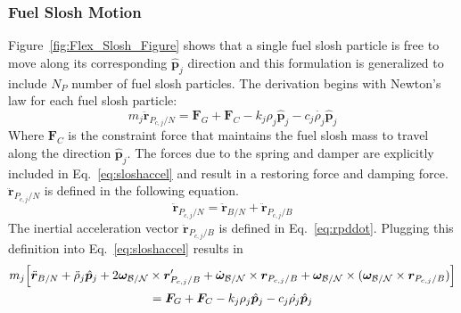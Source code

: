 \subsubsection{Fuel Slosh Motion}
Figure~\ref{fig:Flex_Slosh_Figure} shows that a single fuel slosh particle is free to move along its corresponding $\hat{\bm p}_j$ direction and this formulation is generalized to include $N_P$ number of fuel slosh particles. The derivation begins with Newton's law for each fuel slosh particle:
\begin{equation}
	m_j \ddot{\bm{r}}_{P_{c,j}/N} = \bm F_G + \bm F_C- k_j \rho_j \hat{\bm p}_j - c_j \dot{\rho_j} \hat{\bm p}_j
	\label{eq:sloshaccel}
\end{equation}
Where $\bm F_C$ is the constraint force that maintains the fuel slosh mass to travel along the direction $\hat{\bm p}_j$. The forces due to the spring and damper are explicitly included in Eq.~\eqref{eq:sloshaccel} and result in a restoring force and damping force. $\ddot{\bm{r}}_{P_{c,j}/N}$ is defined in the following equation.
\begin{equation}
	\ddot{\bm{r}}_{P_{c,j}/N} = \ddot{\bm{r}}_{B/N} + \ddot{\bm{r}}_{P_{c,j}/B}
\end{equation}
The inertial acceleration vector $\ddot{\bm{r}}_{P_{c,j}/B}$ is defined in Eq.~\eqref{eq:rpddot}. Plugging this definition into Eq.~\eqref{eq:sloshaccel} results in
\begin{multline}
	m_j \Big[\ddot{\bm{r}}_{B/N} + \ddot{\rho}_j \hat{\bm p}_j  +2 \bm\omega_{\cal B/N} \times \bm{r}'_{P_{c,j}/B} + \dot{\bm\omega}_{\cal B/N} \times \bm{r}_{P_{c,j}/B}  +\bm\omega_{\cal B/N} \times (\bm\omega_{\cal B/N} \times \bm{r}_{P_{c,j}/B})\Big]\\
	=  \bm F_G + \bm F_C - k_j \rho_j \hat{\bm p}_j - c_j \dot{\rho_j} \hat{\bm p}_j
	\label{eq:sloshaccel3}
\end{multline}	

